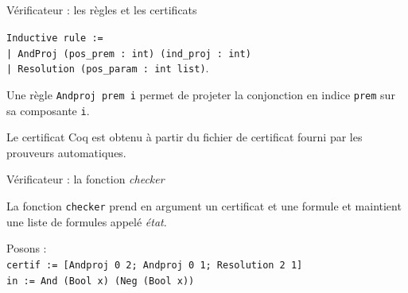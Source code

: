 \documentclass{beamer}
\begin{document}
    \subsection{}
    \begin{frame}{Vérificateur : les règles et les certificats}

      \texttt{Inductive rule :=}\\
      \texttt{| AndProj (pos\_prem\,:\,int) (ind\_proj\,:\,int)}\\
      \texttt{| Resolution (pos\_param\,:\,int list)}.


      \vspace{0.5cm}

      Une règle \texttt{Andproj prem i} permet de projeter la conjonction en indice \texttt{prem} sur sa composante \texttt{i}.

      \vspace{0.5cm}

      Le certificat Coq est obtenu à partir du fichier de certificat fourni par les prouveurs automatiques.
    \end{frame}

    \begin{frame}{Vérificateur : la fonction \textit{checker}}

      La fonction \texttt{checker} prend en argument un certificat et une formule et maintient une liste de formules appelé \textit{état}.

      \vspace {0.3cm}

      Posons : \\
      \texttt{certif := [Andproj 0 2; Andproj 0 1; Resolution 2 1]}\\
      \texttt{in := And (Bool x) (Neg (Bool x))}\\
      \vspace{0.3cm}

      \vspace{1mm}

      \vspace{1mm}

      \vspace{1mm}
    \end{frame}
\end{document}

